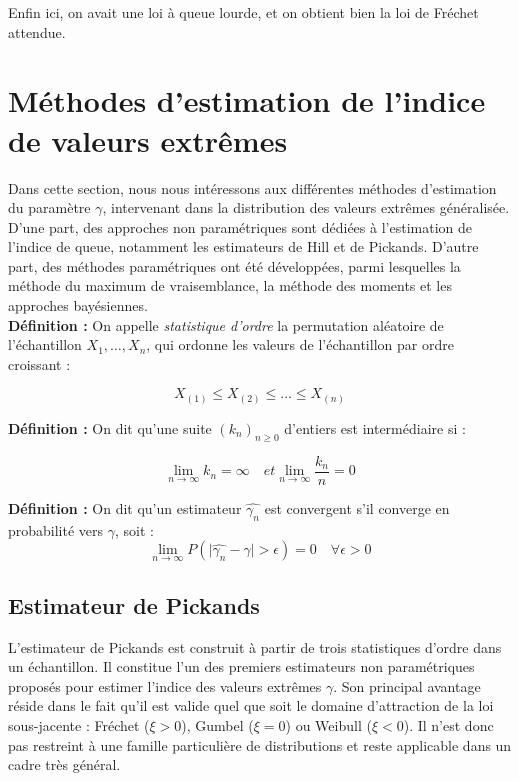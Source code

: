 \documentclass{article}
\theoremstyle{plain}
\theoremstyle{definition}
\theoremstyle{plain}
\begin{document}
\noindent Enfin ici, on avait une loi à queue lourde, et on obtient bien la loi de Fréchet attendue.

\newpage

\section{Méthodes d'estimation de l'indice de valeurs extrêmes}
Dans cette section, nous nous intéressons aux différentes méthodes d'estimation du paramètre \(\gamma\), intervenant dans la distribution des valeurs extrêmes généralisée. \\
D'une part, des approches non paramétriques sont dédiées à l'estimation de l'indice de queue, notamment les estimateurs de Hill et de Pickands. D'autre part, des méthodes paramétriques ont été développées, parmi lesquelles la méthode du maximum de vraisemblance, la méthode des moments et les approches bayésiennes. \\

\textbf{Définition :} On appelle \textit{statistique d'ordre} la permutation aléatoire de l'échantillon \(X_1, \dots, X_n\), qui ordonne les valeurs de l’échantillon par ordre croissant :

\[
X_{(1)} \leq X_{(2)} \leq \dots \leq X_{(n)}
\]

\textbf{Définition :} On dit qu'une suite \((k_n)_{n \geq 0}\) d'entiers est intermédiaire si :

\[
\lim_{n \to \infty} k_n = \infty \quad et \lim_{n \to \infty} \frac{k_n}{n} = 0
\]

\textbf{Définition :}
On dit qu'un estimateur \(\hat{\gamma_{n}}\) est convergent s'il converge en probabilité vers \(\gamma\), soit :
\[
\lim_{n \to \infty} P(\lvert \hat{\gamma_{n}} - \gamma \rvert > \epsilon) = 0 \quad \forall \epsilon > 0
\]

\subsection{Estimateur de Pickands}

L’estimateur de Pickands est construit à partir de trois statistiques d’ordre dans un échantillon. Il constitue l’un des premiers estimateurs non paramétriques proposés pour estimer l’indice des valeurs extrêmes \(\gamma\). Son principal avantage réside dans le fait qu’il est valide quel que soit le domaine d’attraction de la loi sous-jacente : Fréchet (\(\xi > 0\)), Gumbel (\(\xi = 0\)) ou Weibull (\(\xi < 0\)). Il n'est donc pas restreint à une famille particulière de distributions et reste applicable dans un cadre très général.
\end{document}
